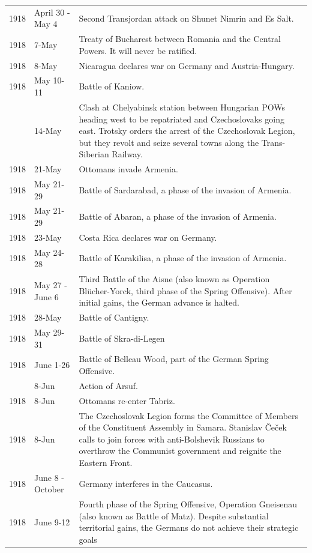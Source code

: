 \documentclass[
  openany]{book}
\begin{document}
\begin{longtable}[t]{rl>{\raggedright\arraybackslash}p{22em}}
1918 & April 30 - May 4 & Second Transjordan attack on Shunet Nimrin and Es Salt.\\
\rowcolor{gray!6}  1918 & 7-May & Treaty of Bucharest between Romania and the Central Powers. It will never be ratified.\\
1918 & 8-May & Nicaragua declares war on Germany and Austria-Hungary.\\
\rowcolor{gray!6}  1918 & May 10-11 & Battle of Kaniow.\\
\addlinespace
1918 & 14-May & Clash at Chelyabinsk station between Hungarian POWs heading west to be repatriated and Czechoslovaks going east. Trotsky orders the arrest of the Czechoslovak Legion, but they revolt and seize several towns along the Trans-Siberian Railway.\\
\rowcolor{gray!6}  1918 & 21-May & Ottomans invade Armenia.\\
1918 & May 21-29 & Battle of Sardarabad, a phase of the invasion of Armenia.\\
\rowcolor{gray!6}  1918 & May 21-29 & Battle of Abaran, a phase of the invasion of Armenia.\\
1918 & 23-May & Costa Rica declares war on Germany.\\
\addlinespace
\rowcolor{gray!6}  1918 & May 24-28 & Battle of Karakilisa, a phase of the invasion of Armenia.\\
1918 & May 27 - June 6 & Third Battle of the Aisne (also known as Operation Blücher-Yorck, third phase of the Spring Offensive). After initial gains, the German advance is halted.\\
\rowcolor{gray!6}  1918 & 28-May & Battle of Cantigny.\\
1918 & May 29-31 & Battle of Skra-di-Legen\\
\rowcolor{gray!6}  1918 & June 1-26 & Battle of Belleau Wood, part of the German Spring Offensive.\\
\addlinespace
1918 & 8-Jun & Action of Arsuf.\\
\rowcolor{gray!6}  1918 & 8-Jun & Ottomans re-enter Tabriz.\\
1918 & 8-Jun & The Czechoslovak Legion forms the Committee of Members of the Constituent Assembly in Samara. Stanislav Čeček calls to join forces with anti-Bolshevik Russians to overthrow the Communist government and reignite the Eastern Front.\\
\rowcolor{gray!6}  1918 & June 8 - October & Germany interferes in the Caucasus.\\
1918 & June 9-12 & Fourth phase of the Spring Offensive, Operation Gneisenau (also known as Battle of Matz). Despite substantial territorial gains, the Germans do not achieve their strategic goals\\

\end{longtable}
\end{document}
